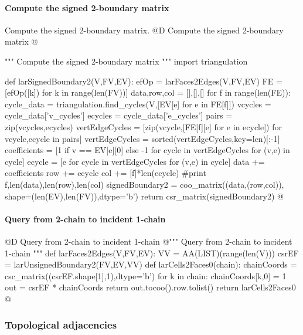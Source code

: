\documentclass[11pt,oneside]{article}	%
\begin{document}
\paragraph{Compute the signed 2-boundary matrix}
Compute the signed 2-boundary matrix.
@D Compute the signed 2-boundary matrix
@{""" Compute the signed 2-boundary matrix """
import triangulation
    
def larSignedBoundary2(V,FV,EV):
    efOp = larFaces2Edges(V,FV,EV)
    FE = [efOp([k]) for k in range(len(FV))]
    data,row,col = [],[],[]
    for f in range(len(FE)):
        cycle_data = triangulation.find_cycles(V,[EV[e] for e in FE[f]])
        vcycles = cycle_data['v_cycles']
        ecycles = cycle_data['e_cycles']
        pairs = zip(vcycles,ecycles)
        vertEdgeCycles = [zip(vcycle,[FE[f][e] for e in ecycle]) for vcycle,ecycle in pairs]
        vertEdgeCycles = sorted(vertEdgeCycles,key=len)[:-1]
        coefficients = [1 if v == EV[e][0] else -1 for cycle in vertEdgeCycles for (v,e) in cycle]
        ecycle = [e for cycle in vertEdgeCycles for (v,e) in cycle]
        data += coefficients
        row += ecycle
        col += [f]*len(ecycle)
        #print f,len(data),len(row),len(col)
    signedBoundary2 = coo_matrix((data,(row,col)), shape=(len(EV),len(FV)),dtype='b')
    return csr_matrix(signedBoundary2)
@}


\paragraph{Query from 2-chain to incident 1-chain}
@D Query from 2-chain to incident 1-chain
@{""" Query from 2-chain to incident 1-chain """
def larFaces2Edges(V,FV,EV):
    VV = AA(LIST)(range(len(V)))
    csrEF = larUnsignedBoundary2(FV,EV,VV)
    def larCells2Faces0(chain):
        chainCoords = csc_matrix((csrEF.shape[1],1),dtype='b')
        for k in chain: chainCoords[k,0] = 1
        out = csrEF * chainCoords
        return out.tocoo().row.tolist()
    return larCells2Faces0
@}



\subsubsection{Topological adjacencies}
\end{document}
